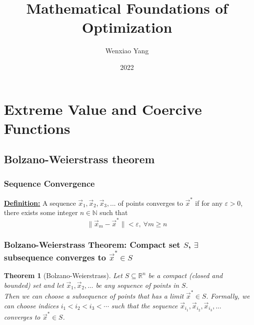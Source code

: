 \documentclass[11pt,a4paper]{article}
\title{\textbf{Mathematical Foundations of Optimization}}
\author[*]{Wenxiao Yang}
\affil[*]{Department of Mathematics, University of Illinois at Urbana-Champaign}
\date{2022}
\newtheorem{theorem}{Theorem}
\begin{document}
\maketitle
\tableofcontents
\newpage

\section{Extreme Value and Coercive Functions}

\subsection{Bolzano-Weierstrass theorem}
\subsubsection{Sequence Convergence}
\textbf{\underline{Definition:}} A sequence $\vec{x}_1,\vec{x}_2,\vec{x}_3,...$ of points converges to $\vec{x}^*$ if for any $\varepsilon>0$, there exists some integer $n\in \mathbb{N}$ such that $$\|\vec{x}_m-\vec{x}^*\|<\varepsilon,\ \forall m\geq n$$

\subsubsection{Bolzano-Weierstrass Theorem: Compact set $S$, $\exists$ subsequence converges to $\vec{x}^*\in S$}
\begin{theorem}[Bolzano-Weierstrass]
    Let $S\subseteq \mathbb{R}^n$ be a compact (closed and bounded) set and let $\vec{x}_1,\vec{x}_2,...$ be any sequence of points in $S$.\\
    Then we can choose a subsequence of points that has a limit $\vec{x}^*\in S$. Formally, we can choose indices $i_1<i_2<i_3<\cdots$ such that the sequence $\vec{x}_{i_1},\vec{x}_{i_2},\vec{x}_{i_3},...$ converges to $\vec{x}^*\in S$.
\end{theorem}
\begin{center}
\end{center}
\end{document}
